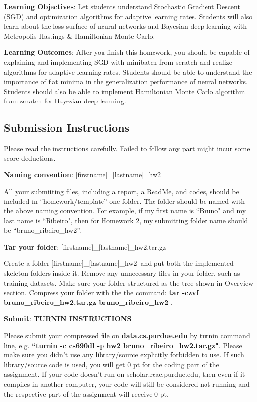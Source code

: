 \documentclass{article}
\newcommand{\homeworknumber}{2}
\begin{document}
\noindent\textbf{Learning Objectives}: Let students understand Stochastic Gradient Descent (SGD) and optimization algorithms for  adaptive learning rates. Students will also learn about the loss surface of neural networks and Bayesian deep learning with Metropolis Hastings \& Hamiltonian Monte Carlo.

\hfill

\noindent \textbf{Learning Outcomes}: After you finish this homework, you should be capable of explaining and implementing SGD with minibatch from scratch and realize algorithms for adaptive learning rates. Students should be able to understand the importance of flat minima in the generalization performance of neural networks.
Students should also be able to implement Hamiltonian Monte Carlo algorithm from scratch for Bayesian deep learning.

\hfill


\newpage



\subsection*{Submission Instructions}

Please read the instructions carefully. Failed to follow any part might incur some score deductions.

\hfill

\noindent \textbf{Naming convention}: [firstname]\_[lastname]\_hw\homeworknumber

All your submitting files, including a report, a ReadMe, and codes, should be included in ``homework/template'' one folder. The folder should be named with the above naming convention. For example, if my first name is ``Bruno" and my last name is ``Ribeiro", then for Homework \homeworknumber, my submitting folder name should be ``bruno\_ribeiro\_hw\homeworknumber''.


\hfill

\noindent \textbf{Tar your folder}: [firstname]\_[lastname]\_hw\homeworknumber.tar.gz

Create a folder [firstname]\_[lastname]\_hw\homeworknumber\ 
 and put both the implemented skeleton folders inside it. Remove any unnecessary files in your folder, such as training datasets. Make sure your folder structured as the tree shown in Overview section. Compress your folder with the the command: \textbf{tar -czvf bruno\_ribeiro\_hw\homeworknumber.tar.gz bruno\_ribeiro\_hw\homeworknumber} .


\hfill

\noindent \textbf{Submit}: 
{\bf TURNIN INSTRUCTIONS}

Please submit your compressed file on \textbf{data.cs.purdue.edu} by turnin command line, e.g. \textbf{``turnin -c cs690dl -p hw\homeworknumber{} bruno\_ribeiro\_hw\homeworknumber.tar.gz"}.
Please make sure you didn’t use any library/source explicitly forbidden to use. If such library/source code is used, you will get 0 pt for the coding part of the assignment. If your code doesn’t run on scholar.rcac.purdue.edu, then even if it compiles in another computer, your code will still be considered not-running and the respective part of the assignment will receive 0 pt.
\end{document}
